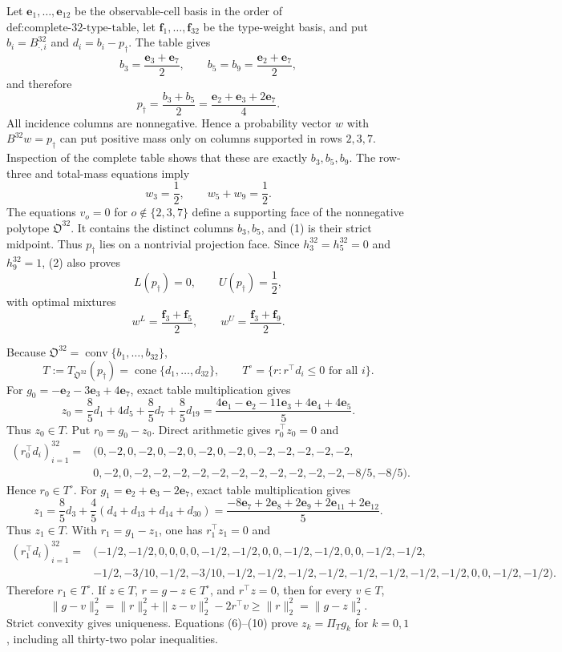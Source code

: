 Let \(\mathbf e_1,\ldots,\mathbf e_{12}\) be the observable-cell basis in the order of \(\text{def:complete-32-type-table}\), let \(\mathbf f_1,\ldots,\mathbf f_{32}\) be the type-weight basis, and put \(b_i=B^{32}_{\cdot,i}\) and \(d_i=b_i-p_\dagger\).  The table gives
\[
b_3=\frac{\mathbf e_3+\mathbf e_7}{2},
\qquad
b_5=b_9=\frac{\mathbf e_2+\mathbf e_7}{2},
\]
and therefore
\[
p_\dagger=\frac{b_3+b_5}{2}
=\frac{\mathbf e_2+\mathbf e_3+2\mathbf e_7}{4}.
\tag{1}
\]
All incidence columns are nonnegative.  Hence a probability vector \(w\) with \(B^{32}w=p_\dagger\) can put positive mass only on columns supported in rows \(2,3,7\).  Inspection of the complete table shows that these are exactly \(b_3,b_5,b_9\).  The row-three and total-mass equations imply
\[
w_3=\frac12,
\qquad
w_5+w_9=\frac12.
\tag{2}
\]
The equations \(v_o=0\) for \(o\notin\{2,3,7\}\) define a supporting face of the nonnegative polytope \(\mathfrak O^{32}\).  It contains the distinct columns \(b_3,b_5\), and (1) is their strict midpoint.  Thus \(p_\dagger\) lies on a nontrivial projection face.  Since \(h^{32}_3=h^{32}_5=0\) and \(h^{32}_9=1\), (2) also proves
\[
L(p_\dagger)=0,
\qquad
U(p_\dagger)=\frac12,
\tag{3}
\]
with optimal mixtures
\[
w^L=\frac{\mathbf f_3+\mathbf f_5}{2},
\qquad
w^U=\frac{\mathbf f_3+\mathbf f_9}{2}.
\tag{4}
\]

Because \(\mathfrak O^{32}=\operatorname{conv}\{b_1,\ldots,b_{32}\}\),
\[
T:=T_{\mathfrak O^{32}}(p_\dagger)
=\operatorname{cone}\{d_1,\ldots,d_{32}\},
\qquad
T^\circ=\{r:r^{\top}d_i\leq0\text{ for all }i\}.
\tag{5}
\]
For \(g_0=-\mathbf e_2-3\mathbf e_3+4\mathbf e_7\), exact table multiplication gives
\[
z_0=\frac85d_1+4d_5+\frac85d_7+\frac85d_{19}
=\frac{4\mathbf e_1-\mathbf e_2-11\mathbf e_3+4\mathbf e_4+4\mathbf e_5}{5}.
\tag{6}
\]
Thus \(z_0\in T\).  Put \(r_0=g_0-z_0\).  Direct arithmetic gives \(r_0^{\top}z_0=0\) and
\[
\begin{aligned}
(r_0^{\top}d_i)_{i=1}^{32}={}&(0,-2,0,-2,0,-2,0,-2,
0,-2,0,-2,-2,-2,-2,-2,\\
&0,-2,0,-2,-2,-2,-2,-2,-2,-2,-2,-2,-2,-2,-8/5,-8/5).
\end{aligned}
\tag{7}
\]
Hence \(r_0\in T^\circ\).  For \(g_1=\mathbf e_2+\mathbf e_3-2\mathbf e_7\), exact table multiplication gives
\[
z_1=\frac85d_3+\frac45(d_4+d_{13}+d_{14}+d_{30})
=\frac{-8\mathbf e_7+2\mathbf e_8+2\mathbf e_9+2\mathbf e_{11}+2\mathbf e_{12}}5.
\tag{8}
\]
Thus \(z_1\in T\).  With \(r_1=g_1-z_1\), one has \(r_1^{\top}z_1=0\) and
\[
\begin{aligned}
(r_1^{\top}d_i)_{i=1}^{32}={}&(-1/2,-1/2,0,0,0,0,-1/2,-1/2,
0,0,-1/2,-1/2,0,0,-1/2,-1/2,\\
&-1/2,-3/10,-1/2,-3/10,-1/2,-1/2,-1/2,-1/2,
-1/2,-1/2,-1/2,-1/2,0,0,-1/2,-1/2).
\end{aligned}
\tag{9}
\]
Therefore \(r_1\in T^\circ\).  If \(z\in T\), \(r=g-z\in T^\circ\), and \(r^{\top}z=0\), then for every \(v\in T\),
\[
\|g-v\|_2^2
=\|r\|_2^2+\|z-v\|_2^2-2r^{\top}v
\geq\|r\|_2^2
=\|g-z\|_2^2.
\tag{10}
\]
Strict convexity gives uniqueness.  Equations (6)--(10) prove \(z_k=\Pi_Tg_k\) for \(k=0,1\), including all thirty-two polar inequalities.

